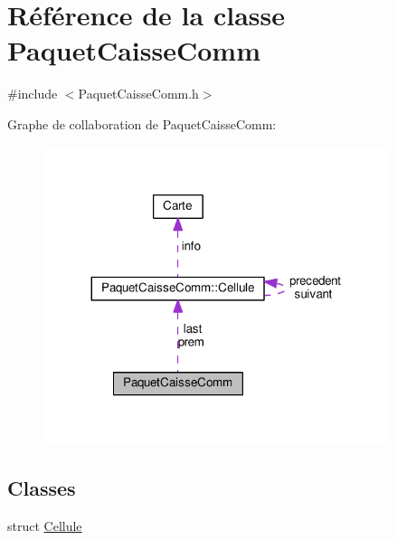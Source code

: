 \hypertarget{classPaquetCaisseComm}{}\section{Référence de la classe Paquet\+Caisse\+Comm}
\label{classPaquetCaisseComm}


{\ttfamily \#include $<$Paquet\+Caisse\+Comm.\+h$>$}



Graphe de collaboration de Paquet\+Caisse\+Comm\+:
\nopagebreak
\begin{figure}[H]
\begin{center}
\leavevmode
\includegraphics[width=287pt]{classPaquetCaisseComm__coll__graph}
\end{center}
\end{figure}
\subsection*{Classes}
\begin{DoxyCompactItemize}
\item 
struct \hyperlink{structPaquetCaisseComm_1_1Cellule}{Cellule}
\end{DoxyCompactItemize}
